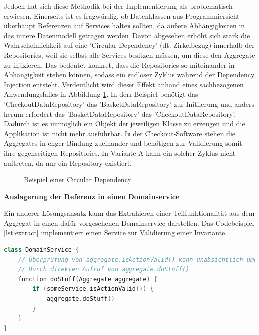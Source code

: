 Jedoch hat sich diese Methodik bei der Implementierung als problematisch erwiesen. Einerseits ist es fragwürdig, ob Datenklassen aus Programmiersicht überhaupt Referenzen auf Services halten sollten, da äußere Abhängigkeiten in das innere Datenmodell getragen werden. Davon abgesehen erhöht sich stark die Wahrscheinlichkeit auf eine 'Circular Dependency' (dt. Zirkelbezug) innerhalb der Repositories, weil sie selbst alle Services besitzen müssen, um diese den Aggregate zu injizieren. Das bedeutet konkret, dass die Repositories so miteinander in Abhängigkeit stehen können, sodass ein endloser Zyklus während der Dependency Injection entsteht. Verdeutlicht wird dieser Effekt anhand eines sachbezogenen Anwendungsfalles in Abbildung \ref{fig:CircularDependency}. In dem Beispiel benötigt das 'CheckoutDataRepository' das 'BasketDataRepository' zur Initiierung und anders herum erfordert das 'BasketDataRepository' das 'CheckoutDataRepository'. Dadurch ist es unmöglich ein Objekt der jeweiligen Klasse zu erzeugen und die Applikation ist nicht mehr ausführbar. In der Checkout-Software stehen die Aggregates in enger Bindung zueinander und benötigen zur Validierung somit ihre gegenseitigen Repositories. In Variante A kann ein solcher Zyklus nicht auftreten, da nur ein Repository existiert.

\begin{figure}[htbp]
	\centering
	
	\caption{Beispiel einer Circular Dependency}
	\label{fig:CircularDependency}
\end{figure}

\textbf{Auslagerung der Referenz in einen Domainservice}

Ein anderer Lösungsansatz kann das Extrahieren einer Teilfunktionalität aus dem Aggregat in einen dafür vorgesehenen Domainservice darstellen. Das Codebeispiel \ref{lst:extract} implementiert einen Service zur Validierung einer Invariante. 

\begin{minipage}{\linewidth} %
	\begin{lstlisting}[caption={Auslagerung der Referenz in einen Domainservice}, label={lst:extract}, language=Kotlin]
class DomainService {
	// Überprüfung von aggregate.isActionValid() kann unabsichtlich umgangen werden
	// Durch direkten Aufruf von aggregate.doStuff()
	function doStuff(Aggregate aggregate) {
		if (someService.isActionValid()) {     
			aggregate.doStuff()
		}
	}
}
	\end{lstlisting}
\end{minipage}

